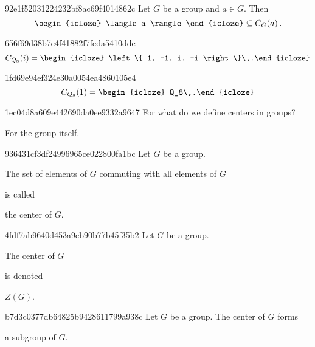 \begin{note}{92e1f52031224232bf8ac69f4014862c}
    Let \({ G }\) be a group and \({ a \in G }\).
    Then
    \[
        \begin{icloze}{1}\langle a \rangle\end{icloze} \subseteq C_G(a)\,.
    \]
\end{note}

\begin{note}{656f69d38b7e4f41882f7feda5410dde}
    \[
        C_{Q_8}(i) = \begin{icloze}{1}\left\{ 1, -1, i, -i \right\}\,.\end{icloze}
    \]
\end{note}

\begin{note}{1fd69e94ef324e30a0054ea4860105e4}
    \[
        C_{Q_8}(1) = \begin{icloze}{1}Q_8\,.\end{icloze}
    \]
\end{note}

\begin{note}{1ec04d8a609e442690da0ee9332a9647}
    For what do we define centers in groups?

    \begin{cloze}{1}
        For the group itself.
    \end{cloze}
\end{note}

\begin{note}{936431cf3df24996965ce022800fa1bc}
    Let \({ G }\) be a group.
    \begin{icloze}{2}The set of elements of \({ G }\) commuting with all elements of \({ G }\)\end{icloze} is called \begin{icloze}{1}the center of \({ G }\).\end{icloze}
\end{note}

\begin{note}{4fdf7ab9640d453a9eb90b77b45f35b2}
    Let \({ G }\) be a group.
    \begin{icloze}{2}The center of \({ G }\)\end{icloze} is denoted \begin{icloze}{1}\({ Z(G) }\).\end{icloze}
\end{note}

\begin{note}{b7d3c0377db64825b9428611799a938c}
    Let \({ G }\) be a group.
    The center of \({ G }\) forms \begin{icloze}{1}a subgroup of \({ G }\).\end{icloze}
\end{note}

